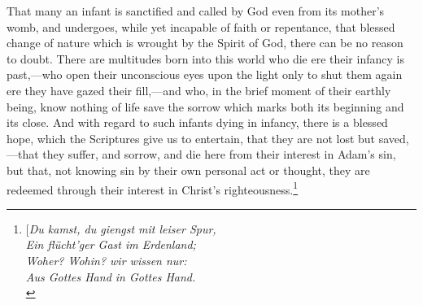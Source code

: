 \documentclass[
]{book}
\begin{document}
That many an infant is sanctified and called by God even from its mother's womb, and undergoes, while yet incapable of faith or repentance, that blessed change of nature which is wrought by the Spirit of God, there can be no reason to doubt. There are multitudes born into this world who die ere their infancy is past,---who open their unconscious eyes upon the light only to shut them again ere they have gazed their fill,---and who, in the brief moment of their earthly being, know nothing of life save the sorrow which marks both its beginning and its close. And with regard to such infants dying in infancy, there is a blessed hope, which the Scriptures give us to entertain, that they are not lost but saved,---that they suffer, and sorrow, and die here from their interest in Adam's sin, but that, not knowing sin by their own personal act or thought, they are redeemed through their interest in Christ's righteousness.\footnote{{[}\foreignlanguage{ngerman}{\emph{Du kamst, du giengst mit leiser Spur,\\
  \hspace*{0.333em}\hspace*{0.333em}\hspace*{0.333em}\hspace*{0.333em}Ein flücht'ger Gast im Erdenland;\\
  Woher? Wohin? wir wissen nur:\\
  \hspace*{0.333em}\hspace*{0.333em}\hspace*{0.333em}\hspace*{0.333em}Aus Gottes Hand in Gottes Hand.\\
}}}
\end{document}
